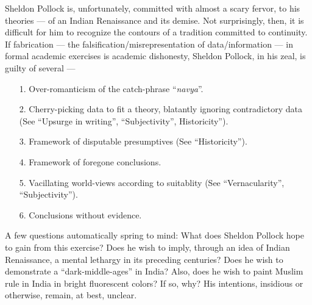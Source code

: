 Sheldon Pollock is, unfortunately, committed with almost a scary fervor, to his theories — of an Indian Renaissance and its demise. Not surprisingly, then, it is difficult for him to recognize the contours of a tradition committed to continuity. If fabrication — the falsification/misrepresentation of data/information —  in formal academic exercises is academic dishonesty, Sheldon Pollock, in his zeal, is guilty of several — 
\begin{itemize}
\itemsep=1pt
\item[1.] Over-romanticism of the catch-phrase “{\sl navya}”.
\item[2.] Cherry-picking data to fit a theory, blatantly ignoring contradictory data (See “Upsurge in writing”, “Subjectivity”, Historicity”).
\item[3.] Framework of disputable presumptives (See “Historicity”).
\item[4.] Framework of foregone conclusions. 
\item[5.] Vacillating world-views according to suitablity (See “Vernacularity”, “Subjectivity”).
\item[6.] Conclusions without evidence.
\end{itemize}

A few questions automatically spring to mind: What does Sheldon Pollock hope to gain from this exercise? Does he wish to imply, through an idea of Indian Renaissance, a mental lethargy in its preceding centuries? Does he wish to demonstrate a “dark-middle-ages” in India? Also, does he wish to paint Muslim rule in India in bright fluorescent colors? If so, why? His intentions, insidious or otherwise, remain, at best, unclear. 

